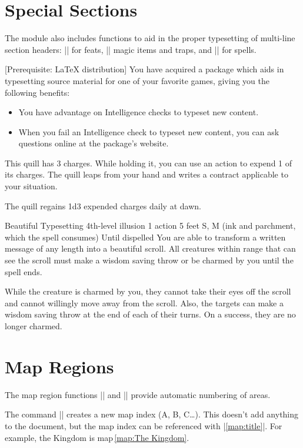 \documentclass[letterpaper,twocolumn,openany,nodeprecatedcode]{dndbook}
\begin{document}
\section{Special Sections}
The module also includes functions to aid in the proper typesetting of multi-line section headers: |\DndFeatHeader| for feats, |\DndItemHeader| magic items and traps, and |\DndSpellHeader| for spells.

[Prerequisite: \LaTeX{} distribution]
You have acquired a package which aids in typesetting source material for one of your favorite games, giving you the following benefits:

\begin{itemize}
  \item You have advantage on Intelligence checks to typeset new content.
  \item When you fail an Intelligence check to typeset new content, you can ask questions online at the package's website.
\end{itemize}

This quill has 3 charges. While holding it, you can use an action to expend 1 of its charges. The quill leaps from your hand and writes a contract applicable to your situation.

The quill regains 1d3 expended charges daily at dawn.

\DndSpellHeader%
  {Beautiful Typesetting}
  {4th-level illusion}
  {1 action}
  {5 feet}
  {S, M (ink and parchment, which the spell consumes)}
  {Until dispelled}
You are able to transform a written message of any length into a beautiful scroll. All creatures within range that can see the scroll must make a wisdom saving throw or be charmed by you until the spell ends.

While the creature is charmed by you, they cannot take their eyes off the scroll and cannot willingly move away from the scroll. Also, the targets can make a wisdom saving throw at the end of each of their turns. On a success, they are no longer charmed.

\section{Map Regions}
The map region functions |\DndArea| and |\DndSubArea| provide automatic numbering of areas.

The command || creates a new map index (A, B, C\ldots). This doesn't add anything to the document, but the map index can be referenced with |\ref{map:title}|. For example, the Kingdom is map\,\ref{map:The Kingdom}.
\end{document}
